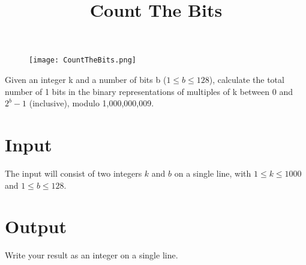\documentclass{article}
\title{Count The Bits}
\date{}
\begin{document}
\maketitle
\begin{figure}[h!]
\centering
\texttt{[image: CountTheBits.png]}
\end{figure}


Given an integer k and a number of bits b ($1 \le b \le 128$),
calculate the total number of 1 bits in the binary representations of
multiples of k between 0 and $2^b-1$ (inclusive), modulo 1,000,000,009.

\section{Input}

The input will consist of two integers $k$ and $b$ on a single line,
with $1\le k \le 1000$ and $1 \le b \le 128$.

\section{Output}

Write your result as an integer on a single line.

\end{document}

